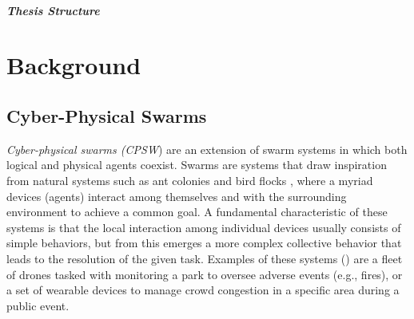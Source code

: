 \documentclass[12pt,a4paper,openright,twoside]{book}
\begin{document}
%
\paragraph{Thesis Structure} 


\chapter{Background}
\label{chap:background}

\section{Cyber-Physical Swarms}


\emph{Cyber-physical swarms (CPSW}) are an extension of swarm systems in which both logical and
    physical agents coexist. Swarms are systems that draw inspiration from natural systems such as ant colonies 
    and bird flocks \cite{tan2013swarm, roy2014nature, bonabeau1999swarm}, where a myriad devices (agents) interact among themselves and with the surrounding 
    environment to achieve a common goal. A fundamental characteristic of these systems is that the local 
    interaction among individual devices usually consists of simple behaviors, but from this emerges a more 
    complex collective behavior that leads to the resolution of the given task. Examples of these systems () are a fleet of drones tasked with monitoring a park to 
    oversee adverse events (e.g., fires), or a set of wearable devices to manage crowd congestion in a specific area during a public event.
\end{document}
